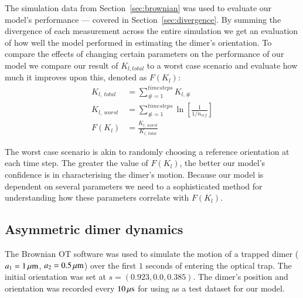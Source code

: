 \documentclass[preprint,  3p]{elsarticle}
\begin{document}
The simulation data from Section~\ref{sec:brownian} was used to evaluate our model's performance --- covered in Section~\ref{sec:divergence}. By summing the divergence of each measurement across the entire simulation we get an evaluation of how well the model performed in estimating the dimer's orientation. To compare the effects of changing certain parameters on the performance of our model we compare our result of $K_{l,total}$ to a worst case scenario and evaluate how much it improves upon this, denoted as $F(K_l)$:
\begin{align}
  K_{l, \ total} &= \sum\limits_{\# =1}^{timesteps} K_{l,\#}
  \\
  K_{l, \ worst} &= \sum\limits_{\#=1}^{timesteps} \ln \left[\frac{1}{1/n_{ref}} \right]
  \\
  F(K_l) &= \frac{K_{l,\ worst}}{K_{l, \ total}}
\end{align}

The worst case scenario is akin to randomly choosing a reference
orientation at each time step. The greater the value of $F(K_l)$, the
better our model's confidence is in characterising the dimer's
motion. Because our model is dependent on several parameters we need
to a sophisticated method for understanding how these parameters
correlate with $F(K_l)$.

\subsection{Asymmetric dimer dynamics}
\label{sec:motion}

The Brownian OT software was used to simulate the motion of a trapped dimer ($a_1=1\,\mu{\rm m}$, $a_2=0.5\,\mu{\rm m}$) over the first $1$ seconds of entering the optical trap. The initial orientation was set at $s = (0.923, 0.0, 0.385)$. The dimer's position and orientation was recorded every $10\,{\rm \mu s}$ for using as a test dataset for our model.
\end{document}
